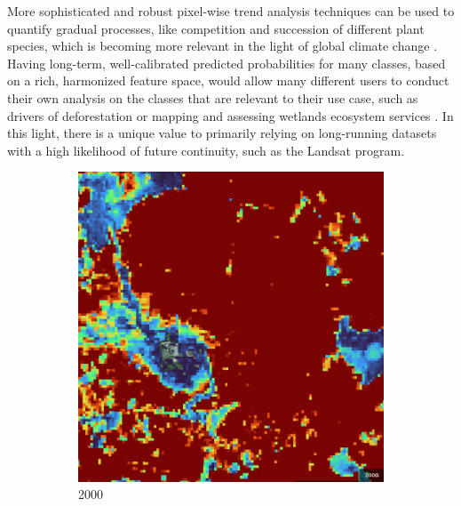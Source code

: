         More sophisticated and robust pixel-wise trend analysis techniques can be used to quantify gradual processes, like competition and succession of different plant species, which is becoming more relevant in the light of global climate change \citep{bonannella2023biomes}. Having long-term, well-calibrated predicted probabilities for many classes, based on a rich, harmonized feature space, would allow many different users to conduct their own analysis on the classes that are relevant to their use case, such as drivers of deforestation \citep{masolele2024mapping} or mapping and assessing wetlands ecosystem services \citep{fitoka2020water}. In this light, there is a unique value to primarily relying on long-running datasets with a high likelihood of future continuity, such as the Landsat program.
        
        \begin{figure}[H]
        \centering
        \begin{subfigure}[t]{0.24\textwidth}
        \centering
        \includegraphics[width=\linewidth,height=\linewidth]{figs_06/brocken_2000.png}
        \caption{2000}
        \end{subfigure}
        \hfill
        \begin{subfigure}[t]{0.24\textwidth}
        \centering

\end{subfigure}
\end{figure}
